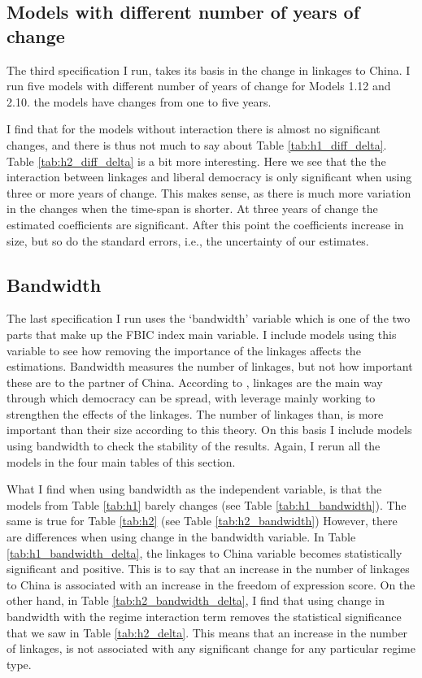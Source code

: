 \subsection{Models with different number of years of change}
The third specification I run, takes its basis in the change in linkages to China. I run five models with different number of years of change for Models 1.12 and 2.10. the models have changes from one to five years.

I find that for the models without interaction there is almost no significant changes, and there is thus not much to say about Table \ref{tab:h1_diff_delta}. Table \ref{tab:h2_diff_delta} is a bit more interesting. Here we see that the the interaction between linkages and liberal democracy is only significant when using three or more years of change. This makes sense, as there is much more variation in the changes when the time-span is shorter. At three years of change the estimated coefficients are significant. After this point the  coefficients increase in size, but so do the standard errors, i.e., the uncertainty of our estimates.

\subsection{Bandwidth}
The last specification I run uses the `bandwidth' variable which is one of the two parts that make up the FBIC index main variable. I include models using this variable to see how removing the importance of the linkages affects the estimations. Bandwidth measures the number of linkages, but not how important these are to the partner of China. According to \citet{levitsky_linkage_2006}, linkages are the main way through which democracy can be spread, with leverage mainly working to strengthen the effects of the linkages. The number of linkages than, is more important than their size according to this theory. On this basis I include models using bandwidth to check the stability of the results. Again, I rerun all the models in the four main tables of this section.

What I find when using bandwidth as the independent variable, is that the models from Table \ref{tab:h1} barely changes (see Table \ref{tab:h1_bandwidth}). The same is true for Table \ref{tab:h2} (see Table \ref{tab:h2_bandwidth}) However, there are differences when using change in the bandwidth variable. In Table \ref{tab:h1_bandwidth_delta}, the linkages to China variable becomes statistically significant and positive. This is to say that an increase in the number of linkages to China is associated with an increase in the freedom of expression score. On the other hand, in Table \ref{tab:h2_bandwidth_delta}, I find that using change in bandwidth with the regime interaction term removes the statistical significance that we saw in Table \ref{tab:h2_delta}. This means that an increase in the number of linkages, is not associated with any significant change for any particular regime type. 

